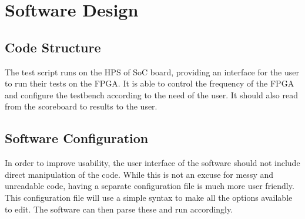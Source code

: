 \chapter{Software Design}

\section{Code Structure}
The test script runs on the HPS of SoC board, providing an interface for the user to run their tests on the FPGA.
It is able to control the frequency of the FPGA and configure the testbench according to the need of the user.
It should also read from the scoreboard to results to the user.

\section{Software Configuration}
In order to improve usability, the user interface of the software should not include direct manipulation of the code.
While this is not an excuse for messy and unreadable code, having a separate configuration file is much more user friendly.
This configuration file will use a simple syntax to make all the options available to edit.
The software can then parse these and run accordingly.
